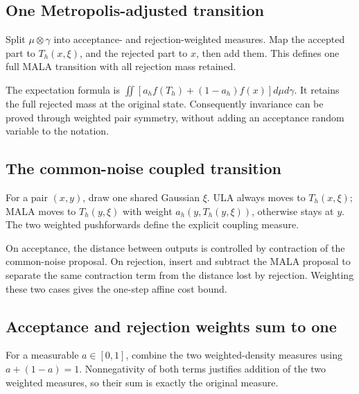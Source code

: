 \documentclass[11pt,a4paper]{report}
\begin{document}
\subsection{\texorpdfstring{One Metropolis-adjusted transition}{One Metropolis-adjusted transition}}
\label{report-step-UnadjustedLangevin-MALACoupling-lean-8}


Split \(\mu\otimes\gamma\) into acceptance- and rejection-weighted measures. Map the accepted part to \(T_h(x,\xi)\), and the rejected part to \(x\), then add them. This defines one full MALA transition with all rejection mass retained.



The expectation formula is \(\iint[a_h f(T_h)+(1-a_h)f(x)]d\mu d\gamma\). It retains the full rejected mass at the original state. Consequently invariance can be proved through weighted pair symmetry, without adding an acceptance random variable to the notation.

\subsection{\texorpdfstring{The common-noise coupled transition}{The common-noise coupled transition}}
\label{report-step-UnadjustedLangevin-MALACoupling-lean-9}


For a pair \((x,y)\), draw one shared Gaussian \(\xi\). ULA always moves to \(T_h(x,\xi)\); MALA moves to \(T_h(y,\xi)\) with weight \(a_h(y,T_h(y,\xi))\), otherwise stays at \(y\). The two weighted pushforwards define the explicit coupling measure.



On acceptance, the distance between outputs is controlled by contraction of the common-noise proposal. On rejection, insert and subtract the MALA proposal to separate the same contraction term from the distance lost by rejection. Weighting these two cases gives the one-step affine cost bound.

\subsection{\texorpdfstring{Acceptance and rejection weights sum to one}{Acceptance and rejection weights sum to one}}
\label{report-step-UnadjustedLangevin-MALACoupling-lean-10}


For a measurable \(a\in[0,1]\), combine the two weighted-density measures using \(a+(1-a)=1\). Nonnegativity of both terms justifies addition of the two weighted measures, so their sum is exactly the original measure.
\end{document}
